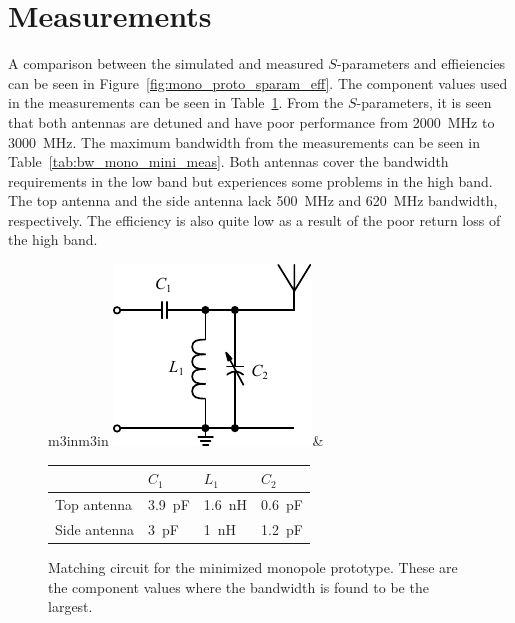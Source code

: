 \FloatBarrier
\section{Measurements}
A comparison between the simulated and measured $S$-parameters and effieiencies can be seen in Figure~\ref{fig:mono_proto_sparam_eff}. The component values used in the measurements can be seen in Table~\ref{fig:matching_mono_mini_meas}. From the $S$-parameters, it is seen that both antennas are detuned and have poor performance from \SI{2000}{MHz} to \SI{3000}{MHz}. The maximum bandwidth from the measurements can be seen in Table~\ref{tab:bw_mono_mini_meas}. Both antennas cover the bandwidth requirements in the low band but experiences some problems in the high band. The top antenna and the side antenna lack \SI{500}{MHz} and \SI{620}{MHz} bandwidth, respectively. 
The efficiency is also quite low as a result of the poor return loss of the high band.

\begin{figure}[htbp]
        \centering
        \begin{tabular}{m{3in}m{3in}}
            \centering
            \includegraphics{img/tech_sol/schematic_tuning_1}&
            \centering
            \footnotesize
            \begin{tabular}{|l|l|l|l|}
                \hline
                & $C_1$ & $L_1$ & $C_2$ \\
                \hline
              Top antenna & \SI{3.9}{pF} & \SI{1.6}{nH} & \SI{0.6}{pF} \\
                Side antenna & \SI{3}{pF} & \SI{1}{nH} & \SI{1.2}{pF} \\
                \hline
            \end{tabular}
        \end{tabular}
    \caption{Matching circuit for the minimized monopole prototype. These are the component values where the bandwidth is found to be the largest.}
    \label{fig:matching_mono_mini_meas}
\end{figure}


